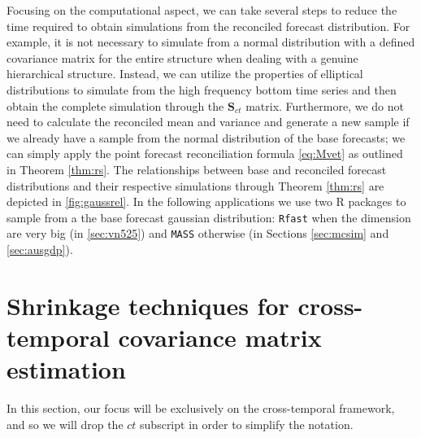 \documentclass[a4paper,11pt]{article}
\newcommand{\Svet}{\bm{S}}
\theoremstyle{definition}
\begin{document}
Focusing on the computational aspect, we can take several steps to reduce the time required to obtain simulations from the reconciled forecast distribution. For example, it is not necessary to simulate from a normal distribution with a defined covariance matrix for the entire structure when dealing with a genuine hierarchical structure. Instead, we can utilize the properties of elliptical distributions to simulate from the high frequency bottom time series and then obtain the complete simulation through the $\Svet_{ct}$ matrix. Furthermore, we do not need to calculate the reconciled mean and variance and generate a new sample if we already have a sample from the normal distribution of the base forecasts; we can simply apply the point forecast reconciliation formula \eqref{eq:Mvet} as outlined in Theorem \ref{thm:rs}. The relationships between base and reconciled forecast distributions and their respective simulations through Theorem \ref{thm:rs} are depicted in \autoref{fig:gaussrel}. In the following applications we use two R packages to sample from a the base forecast gaussian distribution: \texttt{Rfast} \citep{rfast2022} when the dimension are very big (in \autoref{sec:vn525}) and \texttt{MASS} \citep{mass2002} otherwise  (in Sections \ref{sec:mcsim} and \ref{sec:ausgdp}). 



\section{Shrinkage techniques for cross-temporal covariance matrix estimation}\label{sec:shrtech}

In this section, our focus will be exclusively on the cross-temporal framework, and so  we will drop the $ct$ subscript in order to simplify the notation.
\end{document}
